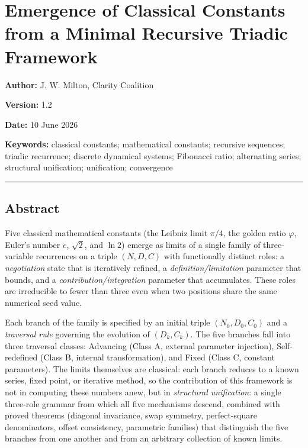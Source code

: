 \documentclass[
  11pt,
  letterpaper,
]{article}
\author{}
\date{}
\begin{document}
\section{Emergence of Classical Constants from a Minimal Recursive
Triadic
Framework}\label{emergence-of-classical-constants-from-a-minimal-recursive-triadic-framework}

\textbf{Author:} J. W. Milton, Clarity Coalition

\textbf{Version:} 1.2

\textbf{Date:} 10 June 2026

\textbf{Keywords:} classical constants; mathematical constants;
recursive sequences; triadic recurrence; discrete dynamical systems;
Fibonacci ratio; alternating series; structural unification;
unification; convergence

\begin{center}\rule{0.5\linewidth}{0.5pt}\end{center}

\subsection{Abstract}\label{abstract}

Five classical mathematical constants (the Leibniz limit \(\pi/4\), the
golden ratio \(\varphi\), Euler's number \(e\), \(\sqrt{2}\), and
\(\ln 2\)) emerge as limits of a single family of three-variable
recurrences on a triple \((N, D, C)\) with functionally distinct roles:
a \emph{negotiation} state that is iteratively refined, a
\emph{definition/limitation} parameter that bounds, and a
\emph{contribution/integration} parameter that accumulates. These roles
are irreducible to fewer than three even when two positions share the
same numerical seed value.

Each branch of the family is specified by an initial triple
\((N_0, D_0, C_0)\) and a \emph{traversal rule} governing the evolution
of \((D_k, C_k)\). The five branches fall into three traversal classes:
Advancing (Class A, external parameter injection), Self-redefined (Class
B, internal transformation), and Fixed (Class C, constant parameters).
The limits themselves are classical: each branch reduces to a known
series, fixed point, or iterative method, so the contribution of this
framework is not in computing these numbers anew, but in
\emph{structural unification}: a single three-role grammar from which
all five mechanisms descend, combined with proved theorems (diagonal
invariance, swap symmetry, perfect-square denominators, offset
consistency, parametric families) that distinguish the five branches
from one another and from an arbitrary collection of known limits.
\end{document}
